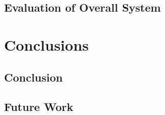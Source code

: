 \documentclass[12pt, a4paper]{report}
\begin{document}

\section{Evaluation of Overall System}


\chapter{Conclusions}

\section{Conclusion}

\section{Future Work}




\end{document}
